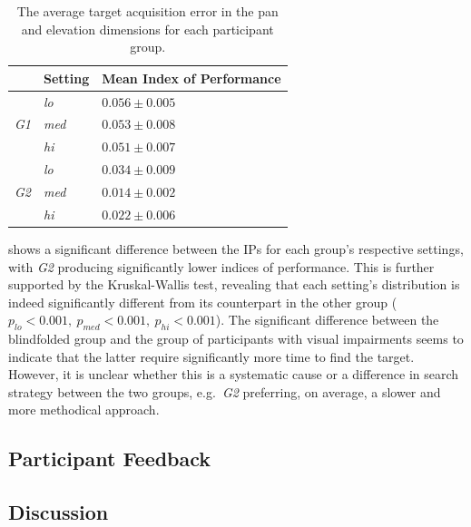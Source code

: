 \documentclass[acmsmall]{acmart}
\begin{document}
\begin{table}
  \centering
  \caption{The average target acquisition error in the pan and elevation dimensions for each participant group. }\label{tab:fitts-results}
  \begin{tabular}{p{0.5cm}p{1.5cm}p{2.5cm}}
    \toprule
    & Setting      & Mean Index of Performance \\ \midrule
    & \textit{lo}  & $0.056\pm0.005$ \\
    \textit{G1} & \textit{med} & $0.053\pm0.008$ \\
		& \textit{hi}  & $0.051\pm0.007$ \\ \cline{2-3}
    & \textit{lo}  & $0.034\pm0.009$ \\
    \textit{G2} & \textit{med} & $0.014\pm0.002$ \\
    & \textit{hi}  & $0.022\pm0.006$ \\
    \bottomrule
  \end{tabular}
\end{table}

 shows a significant difference between the IPs for each group's respective settings, with \textit{G2} producing significantly lower indices of performance.
This is further supported by the Kruskal-Wallis test, revealing that each setting's distribution is indeed significantly different from its counterpart in the other group ($p_{lo} < 0.001,~p_{med} < 0.001,~p_{hi} < 0.001$).
The significant difference between the blindfolded group and the group of participants with visual impairments seems to indicate that the latter require significantly more time to find the target. 
However, it is unclear whether this is a systematic cause or a difference in search strategy between the two groups, e.g.\ \textit{G2} preferring, on average, a slower and more methodical approach.

\subsection{Participant Feedback}


\subsection{Discussion}
\end{document}
